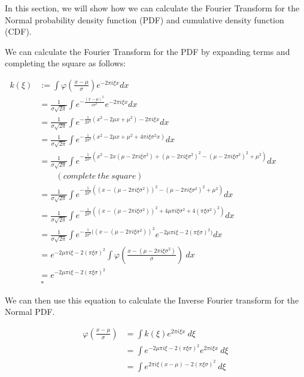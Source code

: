 \documentclass[]{article}
\begin{document}
In this section, we will show how we can calculate the Fourier Transform
for the Normal probability density function (PDF) and cumulative density
function (CDF).

We can calculate the Fourier Transform for the PDF by expanding terms
and completing the square as follows:

\begin{align*}
k(\xi) &:= \int \varphi (\frac{x - \mu}{\sigma}) e^{-2 \pi i \xi x} dx \\
&= \frac{1}{\sigma \sqrt{2 \pi}} \int e^{-\frac{(x - \mu)^2}{s \sigma^2}} e^{-2 \pi i \xi x} dx\\
&= \frac{1}{\sigma \sqrt{2 \pi}} \int e^{-\frac{1}{2 \sigma^2}(x^2 - 2 \mu x + \mu^2) - 2 \pi i \xi x} dx\\
&= \frac{1}{\sigma \sqrt{2 \pi}} \int e^{-\frac{1}{2 \sigma^2}(x^2 - 2 \mu x + \mu^2 + 4 \pi i \xi \sigma^2 x)} dx\\
&= \frac{1}{\sigma \sqrt{2 \pi}} \int e^{-\frac{1}{2 \sigma^2}(x^2 - 2x (\mu - 2 \pi i \xi \sigma^2) + (\mu - 2 \pi i \xi \sigma^2)^2 - (\mu - 2 \pi i \xi \sigma^2)^2 + \mu^2)} dx \hspace{3em}\\
&\hspace{2em}(complete\ the\ square)\\
&= \frac{1}{\sigma \sqrt{2 \pi}} \int e^{-\frac{1}{2 \sigma^2}((x - (\mu - 2 \pi i \xi \sigma^2))^2 - (\mu - 2 \pi i \xi \sigma^2)^2 + \mu^2)} dx\\
&= \frac{1}{\sigma \sqrt{2 \pi}} \int e^{-\frac{1}{2 \sigma^2}((x - (\mu - 2 \pi i \xi \sigma^2))^2 + 4 \mu \pi i \xi \sigma^2 + 4(\pi \xi \sigma^2)^2)} dx\\
&= \frac{1}{\sigma \sqrt{2 \pi}} \int e^{-\frac{1}{2 \sigma^2}((x - (\mu - 2 \pi i \xi \sigma^2))^2}e^{-2 \mu \pi i \xi - 2(\pi \xi \sigma)^2)} dx\\
&= e^{-2 \mu \pi i \xi - 2(\pi \xi \sigma)^2} \int \varphi(\frac{x - (\mu - 2 \pi i \xi \sigma^2)}{\sigma})\ dx\\
&= e^{-2 \mu \pi i \xi - 2(\pi \xi \sigma)^2}\\
&\ \square
\end{align*}

We can then use this equation to calculate the Inverse Fourier transform
for the Normal PDF.

\begin{align*}
\varphi (\frac{x - \mu}{\sigma}) &= \int k(\xi) e^{2\pi i \xi x}\ d\xi\\
&= \int e^{-2 \mu \pi i \xi - 2(\pi \xi \sigma)^2} e^{2\pi i \xi x}\ d\xi\\
&= \int e^{2 \pi i \xi (x - \mu) - 2(\pi \xi \sigma)^2}\ d\xi\\
\end{align*}
\end{document}
